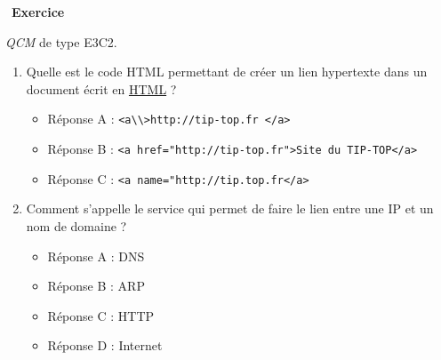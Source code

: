 \documentclass[
  11pt,
]{article}
\newcommand{\passthrough}[1]{#1}
\providecommand{\tightlist}{%
  \setlength{\itemsep}{0pt}\setlength{\parskip}{0pt}}
\newcounter{exo}
\newenvironment{exercice}[1]
{\par \medskip   \addtocounter{exo}{1} \noindent  
\begin{bclogo}[arrondi =0.1,   noborder = true, logo=\bccrayon, marge=4]{~\textbf{Exercice} \textbf{\theexo} {\itshape #1} }  \par}
{
\end{bclogo}
 \par \bigskip }
\newcounter{def}
\begin{document}
\begin{exercice}{}

\emph{QCM} de type E3C2.

\begin{enumerate}
\def\labelenumi{\arabic{enumi}.}
\tightlist
\item
  Quelle est le code HTML permettant de créer un lien hypertexte dans un
  document écrit en
  \href{https://developer.mozilla.org/fr/docs/Glossaire/HTML}{HTML} ?

  \begin{itemize}
  \tightlist
  \item
    Réponse A : \passthrough{\lstinline!<a\\>http://tip-top.fr </a>!}
  \item
    Réponse B :
    \passthrough{\lstinline!<a href="http://tip-top.fr">Site du TIP-TOP</a>!}
  \item
    Réponse C : \passthrough{\lstinline!<a name="http://tip.top.fr</a>!}
  \end{itemize}
\item
  Comment s'appelle le service qui permet de faire le lien entre une IP
  et un nom de domaine ?

  \begin{itemize}
  \tightlist
  \item
    Réponse A : DNS
  \item
    Réponse B : ARP
  \item
    Réponse C : HTTP
  \item
    Réponse D : Internet
  \end{itemize}
\end{enumerate}

\end{exercice}
\end{document}
